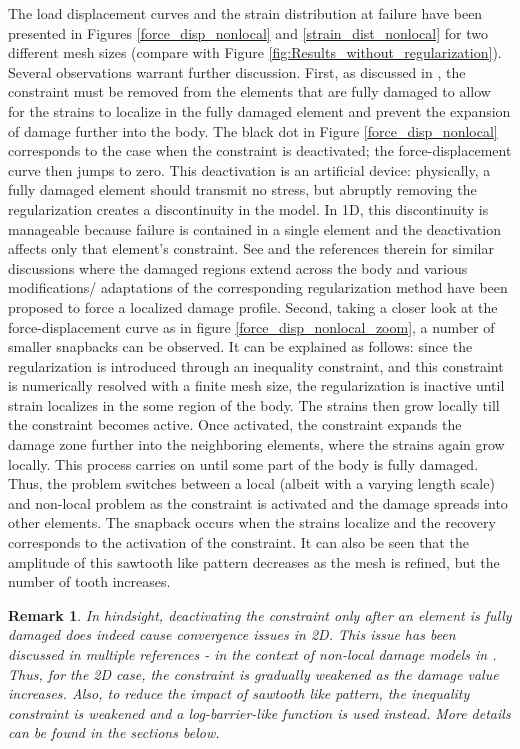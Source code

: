\documentclass[10pt,review]{cas-sc}
\newtheorem*{remark}{Remark}
\begin{document}
The load displacement curves and the strain distribution at failure have been presented in Figures \ref{force_disp_nonlocal} and \ref{strain_dist_nonlocal} for two different mesh sizes (compare with Figure \ref{fig:Results_without_regularization}). Several observations warrant further discussion. First, as discussed in \cite{Kamasamudram2023}, the constraint must be removed from the elements that are fully damaged to allow for the strains to localize in the fully damaged element and prevent the expansion of damage further into the body. The black dot in Figure \ref{force_disp_nonlocal} corresponds to the case when the constraint is deactivated; the force-displacement curve then jumps to zero. This deactivation is an artificial device: physically, a fully damaged element should transmit no stress, but abruptly removing the regularization creates a discontinuity in the model. In 1D, this discontinuity is manageable because failure is contained in a single element and the deactivation affects only that element's constraint. See \cite{Geers1998,Cabot2014,le2018strain} and the references therein for similar discussions where the damaged regions extend across the body and various modifications/ adaptations of the corresponding regularization method have been proposed to force a localized damage profile. Second, taking a closer look at the force-displacement curve as in figure \ref{force_disp_nonlocal_zoom}, a number of smaller snapbacks can be observed. It can be explained as follows: since the regularization is introduced through an inequality constraint, and this constraint is numerically resolved with a finite mesh size, the regularization is inactive until strain localizes in the some region of the body. The strains then grow locally till the constraint becomes active. Once activated, the constraint expands the damage zone further into the neighboring elements, where the strains again grow locally. This process carries on until some part of the body is fully damaged. Thus, the problem switches between a local (albeit with a varying length scale) and non-local problem as the constraint is activated and the damage spreads into other elements. The snapback occurs when the strains localize and the recovery corresponds to the activation of the constraint. It can also be seen that the amplitude of this sawtooth like pattern decreases as the mesh is refined, but the number of tooth increases.


\begin{remark}
	In hindsight, deactivating the constraint only after an element is fully damaged does indeed cause convergence issues in 2D. This issue has been discussed in multiple references - in the context of non-local damage models in \cite{Geers1998}. Thus, for the 2D case, the constraint is gradually weakened as the damage value increases. Also, to reduce the impact of sawtooth like pattern, the inequality constraint is weakened and a log-barrier-like function is used instead. More details can be found in the sections below.
\end{remark}
\end{document}
